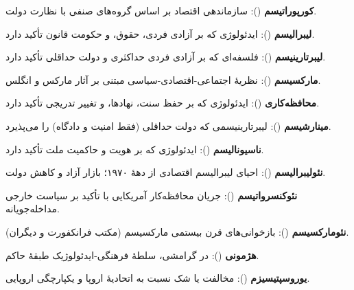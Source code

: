 \textbf{کورپوراتیسم} (): سازماندهی اقتصاد بر اساس گروه‌های صنفی با نظارت دولت.

\textbf{لیبرالیسم} (): ایدئولوژی که بر آزادی فردی، حقوق، و حکومت قانون تأکید دارد.

\textbf{لیبرتارینیسم} (): فلسفه‌ای که بر آزادی فردی حداکثری و دولت حداقلی تأکید دارد.

\textbf{مارکسیسم} (): نظریهٔ اجتماعی-اقتصادی-سیاسی مبتنی بر آثار مارکس و انگلس.

\textbf{محافظه‌کاری} (): ایدئولوژی که بر حفظ سنت، نهادها، و تغییر تدریجی تأکید دارد.

\textbf{مینارشیسم} (): لیبرتارینیسمی که دولت حداقلی (فقط امنیت و دادگاه) را می‌پذیرد.

\textbf{ناسیونالیسم} (): ایدئولوژی که بر هویت و حاکمیت ملت تأکید دارد.

\textbf{نئولیبرالیسم} (): احیای لیبرالیسم اقتصادی از دهۀ ۱۹۷۰؛ بازار آزاد و کاهش دولت.

\textbf{نئوکنسرواتیسم} (): جریان محافظه‌کار آمریکایی با تأکید بر سیاست خارجی مداخله‌جویانه.

\textbf{نئومارکسیسم} (): بازخوانی‌های قرن بیستمی مارکسیسم (مکتب فرانکفورت و دیگران).

\textbf{هژمونی} (): در گرامشی، سلطهٔ فرهنگی-ایدئولوژیک طبقهٔ حاکم.

\textbf{یوروسپتیسیزم} (): مخالفت یا شک نسبت به اتحادیهٔ اروپا و یکپارچگی اروپایی.


